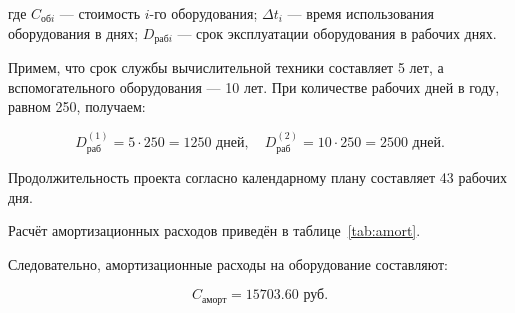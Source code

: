 где $C_{\text{об}i}$ — стоимость $i$-го оборудования;
$\Delta t_i$ — время использования оборудования в днях;
$D_{\text{раб}i}$ — срок эксплуатации оборудования в рабочих днях.

Примем, что срок службы вычислительной техники составляет 5 лет, а
вспомогательного оборудования — 10 лет. При количестве рабочих дней в
году, равном 250, получаем:

\[
D_{\text{раб}}^{(1)} = 5 \cdot 250 = 1250 \text{ дней},
\quad
D_{\text{раб}}^{(2)} = 10 \cdot 250 = 2500 \text{ дней}.
\]

Продолжительность проекта согласно календарному плану составляет
43 рабочих дня.

Расчёт амортизационных расходов приведён в
таблице~\ref{tab:amort}.

\begin{table}[h]
\centering
\caption{Расчёт амортизационных расходов по оборудованию}
\label{tab:amort}
\end{table}

Следовательно, амортизационные расходы на оборудование составляют:

\begin{equation}
C_{\text{аморт}} = 15703.60 \text{ руб.}
\end{equation}


